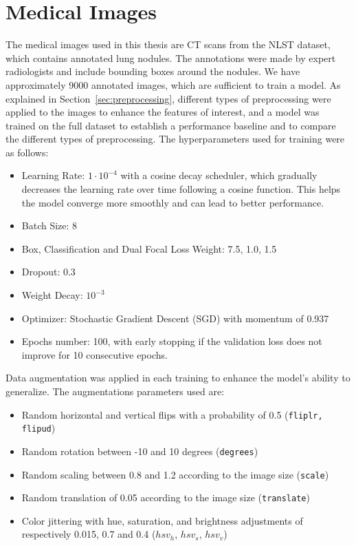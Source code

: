 \section{Medical Images}
The medical images used in this thesis are CT scans from the NLST dataset, which contains annotated lung nodules. The annotations were made by expert radiologists and include bounding boxes around the nodules. We have approximately 9000 annotated images, which are sufficient to train a model.
As explained in Section~\ref{sec:preprocessing}, different types  of preprocessing were applied to the images to enhance the features of interest, and a model was trained on the full dataset to establish a performance baseline and to compare the different types of preprocessing. 
The hyperparameters used for training were as follows:
\begin{itemize}
    \item Learning Rate: $1 \cdot 10^{-4}$ with a cosine decay scheduler, which gradually decreases the learning rate over time following a cosine function. This helps the model converge more smoothly and can lead to better performance.
    \item Batch Size: 8
    \item Box, Classification and Dual Focal Loss Weight: 7.5, 1.0, 1.5
    \item Dropout: 0.3
    \item Weight Decay: $10^{-3}$
    \item Optimizer: Stochastic Gradient Descent (SGD) with momentum of 0.937
    \item Epochs number: 100, with early stopping if the validation loss does not improve for 10 consecutive epochs.
\end{itemize}

Data augmentation was applied in each training to enhance the model's ability to generalize. The augmentations parameters used are:
\begin{itemize}
    \item Random horizontal and vertical flips with a probability of 0.5 (\texttt{fliplr, flipud})
    \item Random rotation between -10 and 10 degrees (\texttt{degrees})
    \item Random scaling between 0.8 and 1.2 according to the image size (\texttt{scale})
    \item Random translation of 0.05 according to the image size (\texttt{translate})
    \item Color jittering with hue, saturation, and brightness adjustments of respectively 0.015, 0.7 and 0.4 (\texttt{$hsv_h$}, \texttt{$hsv_s$}, \texttt{$hsv_v$}) 
\end{itemize}


